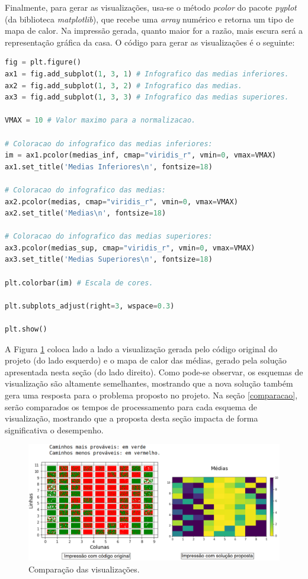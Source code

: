 \documentclass[12pt]{article}
\begin{document}
Finalmente, para gerar as visualizações, usa-se o método \textit{pcolor} do pacote \textit{pyplot} (da biblioteca \textit{matplotlib}), que recebe uma \textit{array} numérico e retorna um tipo de mapa de calor. Na impressão gerada, quanto maior for a razão, mais escura será a representação gráfica da casa. O código para gerar as visualizações é o seguinte:

\begin{lstlisting}[language=Python]
fig = plt.figure()
ax1 = fig.add_subplot(1, 3, 1) # Infografico das medias inferiores.
ax2 = fig.add_subplot(1, 3, 2) # Infografico das medias.
ax3 = fig.add_subplot(1, 3, 3) # Infografico das medias superiores.

VMAX = 10 # Valor maximo para a normalizacao.

# Coloracao do infografico das medias inferiores:
im = ax1.pcolor(medias_inf, cmap="viridis_r", vmin=0, vmax=VMAX)
ax1.set_title('Medias Inferiores\n', fontsize=18)

# Coloracao do infografico das medias:
ax2.pcolor(medias, cmap="viridis_r", vmin=0, vmax=VMAX)
ax2.set_title('Medias\n', fontsize=18)

# Coloracao do infografico das medias superiores:
ax3.pcolor(medias_sup, cmap="viridis_r", vmin=0, vmax=VMAX)
ax3.set_title('Medias Superiores\n', fontsize=18)

plt.colorbar(im) # Escala de cores.

plt.subplots_adjust(right=3, wspace=0.3)

plt.show()
\end{lstlisting}

A Figura \ref{comparacao_visualizacao} coloca lado a lado a visualização gerada pelo código original do projeto (do lado esquerdo) e o mapa de calor das médias, gerado pela solução apresentada nesta seção (do lado direito). Como pode-se observar, os esquemas de visualização são altamente semelhantes, mostrando que a nova solução também gera uma resposta para o problema proposto no projeto. Na seção \ref{comparacao}, serão comparados os tempos de processamento para cada esquema de visualização, mostrando que a proposta desta seção impacta de forma significativa o desempenho.

\begin{figure}[ht!]
	\centering
	\includegraphics[width=1\linewidth]{img/comparacao_visualizacao.png}
	\caption{Comparação das visualizações.}
	\label{comparacao_visualizacao}
\end{figure}
\end{document}
